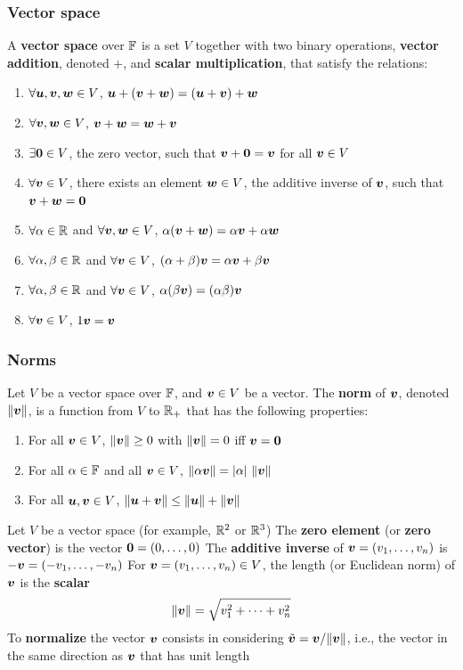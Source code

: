 \documentclass[aspectratio=169]{beamer}\usepackage[]{graphicx}\usepackage[]{xcolor}
\begin{document}
\begin{frame}
\frametitle{Vector space}
	\begin{definition}
		A \textbf{vector space} over $\mathbb{F}$ is a set $V$
		together with two binary operations, \textbf{vector addition}, denoted $+$,
		and \textbf{scalar multiplication}, that satisfy the relations:
		\begin{enumerate}
			\item $\forall\bm{u}, \bm{v}, \bm{w}\in V$, $\bm{u}+(\bm{v}+\bm{w})=(\bm{u}+\bm{v})+\bm{w}$
			\item $\forall\bm{v}, \bm{w}\in V$, $\bm{v} + \bm{w} = \bm{w} + \bm{v}$
			\item $\exists\b0\in V$, the zero vector, such that $\bv +\b0
			= \bv$ for all $\bm{v}\in V$
			\item $\forall\bm{v}\in V$, there exists an element $\bm{w}\in V$, the additive
			inverse of $\bm{v}$, such that $\bv + \bw = \b0$
			\item $\forall\alpha\in\mathbb{R}$ and $\forall \bm{v},\bm{w}\in V$, $\alpha(\bm{v} + \bm{w}) = \alpha \bm{v} +
			\alpha \bm{w}$
			\item $\forall\alpha,\beta\in\mathbb{R}$ and $\forall \bm{v}\in V$, $(\alpha+\beta)\bm{v}=
			\alpha \bm{v} + \beta \bm{v}$
			\item $\forall\alpha,\beta\in\mathbb{R}$ and $\forall\bm{v}\in V$, $\alpha (\beta\bm{v}) =
			(\alpha\beta)\bm{v}$
			\item $\forall\bm{v}\in V$, $1\bm{v} =\bm{v}$
		\end{enumerate}
	\end{definition}
\end{frame}

\begin{frame}
\frametitle{Norms}
	\begin{definition}[Norm]
		Let $V$ be a vector space over $\mathbb{F}$, and $\bm{v}\in V$ be a vector. The
		\textbf{norm} of $\bm{v}$, denoted $\|\bm{v}\|$, is a function from $V$ to $\mathbb{R}_+$ that has the
		following properties:
		\begin{enumerate}
			\item For all $\bm{v}\in V$, $\|\bm{v}\|\geq 0$ with $\|\bm{v}\|=0$ iff $\bv=\b0$
			\item For all $\alpha\in\mathbb{F}$ and all $\bm{v}\in V$, $\|\alpha \bm{v}\|=|\alpha|\ \|\bm{v}\|$
			\item For all $\bm{u},\bm{v}\in V$, $\|\bm{u}+\bm{v}\|\leq\|\bm{u}\|+\|\bm{v}\|$
		\end{enumerate}
	\end{definition}
\end{frame}

\begin{frame}
	Let $V$ be a vector space (for example, $\mathbb{R}^2$ or $\mathbb{R}^3$)
	\vfill
	The \textbf{zero element} (or \textbf{zero vector}) is the vector $\b0=(0,\ldots,0)$
	\vfill
	The \textbf{additive inverse} of $\bm{v}=(v_1,\ldots,v_n)$ is $-\bm{v}=(-v_1,\ldots,-v_n)$ 
	\vfill
	For $\bm{v}=(v_1,\ldots,v_n)\in V$, the length (or Euclidean norm) of $\bm{v}$ is the
	\textbf{scalar}
	\[
	\|\bm{v}\|=\sqrt{v_1^2+\cdots+v_n^2}
	\]
	\vfill
	To \textbf{normalize} the vector $\bm{v}$ consists in considering $\tilde{\bm{v}}=\bm{v}/\|\bm{v}\|$, i.e., the vector in the same direction as $\bm{v}$ that has unit length
\end{frame}
\end{document}

